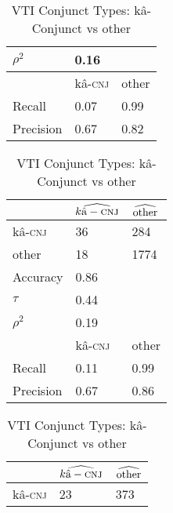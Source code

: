 \begin{table}[H]
\begin{floatrow}[2]
{\begin{tabular}{lll}
$\rho^{2}$           & 0.16               &                       \\
                     \midrule
                     \midrule
                     & kâ-\textsc{cnj}       & other           \\
Recall               & 0.07               & 0.99                  \\
Precision            & 0.67               & 0.82 \\
                \bottomrule
                \end{tabular}}
    {\caption{VAI Conjunct Types: kâ-Conjunct vs other}
      \label{vaiivcms}}
  \end{floatrow}
  \vspace*{1cm}
  \begin{floatrow}[2]
    \ttabbox%
    {                \begin{tabular}{lll}
                \toprule
                     & $\widehat{k\textup{â}-\textsc{cnj}}$ & $\widehat{\textup{other}}$ \\
                \midrule
kâ-\textsc{cnj}         & 36               & 284                    \\
other                   & 18                & 1774                    \\
                     \midrule
                     \midrule
Accuracy             & 0.86               &                       \\
$\tau$               & 0.44               &                       \\
$\rho^{2}$           & 0.19               &                       \\
                     \midrule
                     \midrule
                     & kâ-\textsc{cnj}       & other           \\
Recall               & 0.11               & 0.99                  \\
Precision            & 0.67               & 0.86 \\
                \bottomrule
                \end{tabular}}
    {\caption{VTI Conjunct Types: kâ-Conjunct vs other}
      \label{vtiivcms}}
    \hfill%
    \ttabbox%
        {                \begin{tabular}{lll}
                \toprule
                     & $\widehat{k\textup{â}-\textsc{cnj}}$ & $\widehat{\textup{other}}$ \\
                \midrule
kâ-\textsc{cnj}         & 23               & 373                    \\

\end{tabular}}
\end{floatrow}
\end{table}
